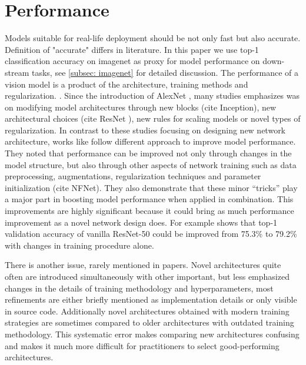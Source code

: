 
\chapter{Performance} \label{sec: performance}

Models suitable for real-life deployment should be not only fast but also accurate. Definition of "accurate" differs in literature. In this paper we use top-1 classification accuracy on imagenet as proxy for model performance on down-stream tasks, see \ref{subsec: imagenet} for detailed discussion. 
The performance of a vision model is a product of the architecture, training methods and regularization. \cite{lee2020_compounding_improvements}. 
Since the introduction of AlexNet \cite{krizhevsky2012_imagenet_alexnet}, many studies emphasizes was on modifying model architectures through new blocks (cite Inception), new architectural choices (cite ResNet ), new rules for scaling models \cite{tan2019_efficientnet} or novel types of regularization. \cite{zhang2017_mixup} \cite{yun2019_cutmix}
In contrast to these studies focusing on designing new network architecture, works like \cite{he2019bag_of_tricks} follow different approach to improve model performance. They noted that performance can be improved not only through changes in the model structure, but also through other aspects of network training such as data preprocessing, augmentations, regularization techniques and parameter initialization (cite NFNet). They also demonstrate that these minor “tricks” play a major part in boosting model performance when applied in combination. This improvements are highly significant because it could bring as much performance improvement as a novel network design does. For example \cite{he2019bag_of_tricks} shows that top-1 validation accuracy of vanilla ResNet-50 could be improved from 75.3\% to 79.2\% with changes in training procedure alone. 


There is another issue, rarely mentioned in papers. Novel architectures quite often are introduced simultaneously with other important, but less emphasized changes in the details of training methodology and hyperparameters, most refinements are either briefly mentioned as implementation details or only visible in source code. Additionally novel architectures obtained with modern training strategies are sometimes compared to older architectures with outdated training methodology. This systematic error makes comparing new architectures confusing and makes it much more difficult for practitioners to select good-performing architectures. 

